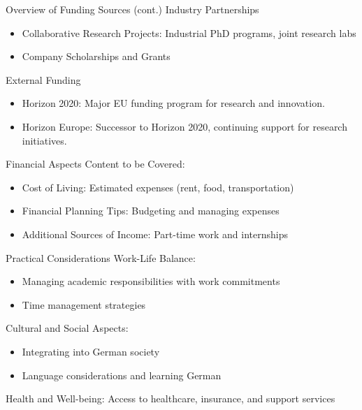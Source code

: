\documentclass[10pt]{beamer}
\begin{document}
\begin{frame}[fragile]{Overview of Funding Sources (cont.)}
\alert{Industry Partnerships}
\begin{itemize}
	\item Collaborative Research Projects: Industrial PhD programs, joint research labs
	\item Company Scholarships and Grants
\end{itemize}
\alert{External Funding}
\begin{itemize}
	\item Horizon 2020: Major EU funding program for research and innovation.
	\item Horizon Europe: Successor to Horizon 2020, continuing support for research initiatives.
\end{itemize}
\end{frame}

\begin{frame}{Financial Aspects}
Content to be Covered:
  \begin{itemize}
  	\item Cost of Living:
Estimated expenses (rent, food, transportation)
  	\item Financial Planning Tips:
Budgeting and managing expenses
  	\item Additional Sources of Income:
Part-time work and internships
  \end{itemize}
\end{frame}

\begin{frame}[fragile]{Practical Considerations}
Work-Life Balance:
\begin{itemize}
	\item Managing academic responsibilities with work commitments
	\item Time management strategies
\end{itemize}
Cultural and Social Aspects:
\begin{itemize}
	\item Integrating into German society
	\item Language considerations and learning German
\end{itemize}
Health and Well-being:
Access to healthcare, insurance, and support services

\end{frame}
\end{document}
